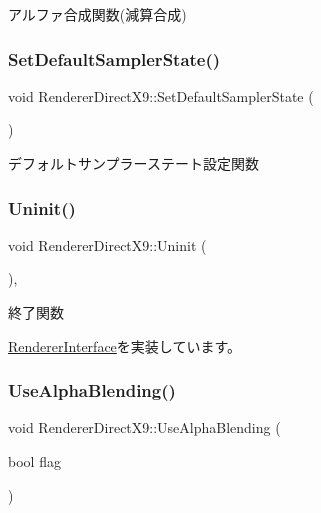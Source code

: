 アルファ合成関数(減算合成) 

\mbox{\label{class_renderer_direct_x9_a229cd266427d96486c43d2e63300e438}} 
\subsubsection{\texorpdfstring{Set\+Default\+Sampler\+State()}{SetDefaultSamplerState()}}
{\footnotesize\ttfamily void Renderer\+Direct\+X9\+::\+Set\+Default\+Sampler\+State (\begin{DoxyParamCaption}{ }\end{DoxyParamCaption})}



デフォルトサンプラーステート設定関数 

\mbox{\label{class_renderer_direct_x9_af7ff314cbaa894d71e37c10565002f8f}} 
\subsubsection{\texorpdfstring{Uninit()}{Uninit()}}
{\footnotesize\ttfamily void Renderer\+Direct\+X9\+::\+Uninit (\begin{DoxyParamCaption}{ }\end{DoxyParamCaption})\hspace{0.3cm}{\ttfamily [override]}, {\ttfamily [virtual]}}



終了関数 



\mbox{\hyperlink{class_renderer_interface_ada105489f9db98e7e9542b278699d558}{Renderer\+Interface}}を実装しています。

\mbox{\label{class_renderer_direct_x9_aa555dda63bdc0f4dfc28ac506d6e8d60}} 
\subsubsection{\texorpdfstring{Use\+Alpha\+Blending()}{UseAlphaBlending()}}
{\footnotesize\ttfamily void Renderer\+Direct\+X9\+::\+Use\+Alpha\+Blending (\begin{DoxyParamCaption}\item[{bool}]{flag }\end{DoxyParamCaption})}



